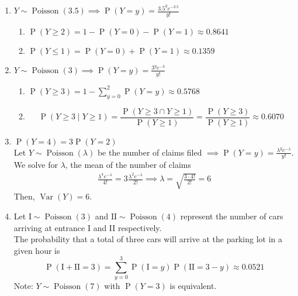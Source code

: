 \documentclass{article}
\title{\MakeUppercase{\jobname}}
\author{Justin Nguyen}
\date{\today}
\newcommand{\pr}[1]{\operatorname{P}(#1)}
\newcommand{\var}[1]{\operatorname{Var}(#1)}
\newcommand{\poisson}[2]{#1 \sim \operatorname{Poisson}(#2)}
\begin{document}
\maketitle


\begin{enumerate}
  \item $\poisson{Y}{3.5} \implies \pr{Y=y} = \frac{3.5^y e^{-3.5}}{y!}$ \begin{enumerate}
    \item $\pr{Y\geq 2} = 1 - \pr{Y=0} - \pr{Y=1} \approx 0.8641$
    \item $\pr{Y \leq 1} = \pr{Y=0} + \pr{Y=1} \approx 0.1359$
  \end{enumerate}
  
  \item $\poisson{Y}{3} \implies \pr{Y=y} = \frac{3^y e^{-3}}{y!}$ \begin{enumerate}
    \item $\pr{Y \geq 3} = 1 - \sum_{y=0}^{2}\pr{Y=y} \approx 0.5768$
    \item \[
      \pr{Y \geq 3 \mid Y \geq 1} 
      = \frac{\pr{Y\geq 3 \cap Y \geq 1}}{\pr{Y\geq 1}}
      = \frac{\pr{Y\geq 3}}{\pr{Y\geq 1}} \approx 0.6070
    \]
  \end{enumerate}
  
  \item $\pr{Y=4} = 3\pr{Y=2}$\\
  Let $\poisson{Y}{\lambda}$ be the number of claims filed $\implies \pr{Y=y} = \frac{\lambda^y e^{-\lambda}}{y!}$.\\
  We solve for $\lambda$, the mean of the number of claims
  \begin{align*}
    \frac{\lambda^4 e^{-\lambda}}{4!} = 3\frac{\lambda^2 e^{-\lambda}}{2!} \implies \lambda = \sqrt{\frac{3\cdot 4!}{2!}} = 6
  \end{align*}
  Then, $\var{Y} = 6$.
  
  \item Let $\poisson{\text{I}}{3}$ and $\poisson{\text{II}}{4}$
  represent the number of cars arriving at entrance \RN{1} and \RN{2} respectively.\\
  The probability that a total of three cars will arrive at the parking lot in a given hour is
  \[
    \pr{\text{I} + \text{II} = 3}
    = \sum_{y=0}^{3}\pr{\text{I} = y}\pr{\text{II} = 3-y} \approx 0.0521
  \]
  Note: $\poisson{Y}{7}$ with $\pr{Y=3}$ is equivalent.
  

\end{enumerate}
\end{document}
